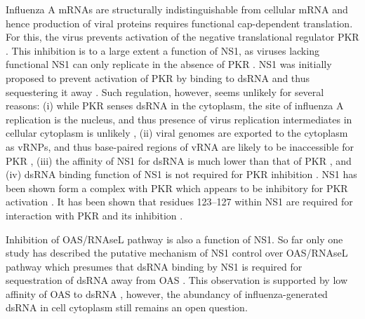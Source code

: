 		Influenza A mRNAs are structurally indistinguishable from cellular mRNA and hence production of viral proteins requires functional cap-dependent translation. For this, the virus prevents activation of the negative translational regulator \gls{PKR}  \parencite{Katze1986, Katze1988}. This inhibition is to a large extent a function of \gls{NS1}, as viruses lacking functional \gls{NS1} can only replicate in the absence of \gls{PKR} \parencite{Bergmann2000a}. \gls{NS1} was initially proposed to prevent activation of \gls{PKR} by binding to dsRNA and thus sequestering it away \parencite{Lu1995}. Such regulation, however, seems unlikely for several reasons: (i) while \gls{PKR} senses dsRNA in the cytoplasm, the site of influenza A replication is the nucleus, and thus presence of virus replication intermediates in cellular cytoplasm is unlikely \parencite{Jackson1982}, (ii) viral genomes are exported to the cytoplasm as \gls{vRNP}s, and thus base-paired regions of \gls{vRNA} are likely to be inaccessible for \gls{PKR} \parencite{Coloma2009}, (iii) the affinity of \gls{NS1} for dsRNA is much lower than that of \gls{PKR} \parencite{Chien2004, Husain2012}, and (iv) dsRNA binding function of \gls{NS1} is not required for \gls{PKR} inhibition \parencite{Li2006}. \gls{NS1} has been shown form a complex with \gls{PKR} which appears to be inhibitory for \gls{PKR} activation \parencite{Tan1998, Li2006}. It has been shown that residues 123--127 within \gls{NS1} are required for interaction with \gls{PKR} and its inhibition \parencite{Min2007}.	
				
		Inhibition of \gls{OAS}/\gls{RNAseL} pathway is also a function of \gls{NS1}. So far only one study has described the putative mechanism of \gls{NS1} control over \gls{OAS}/\gls{RNAseL} pathway which presumes that dsRNA binding by NS1 is required for sequestration of dsRNA away from \gls{OAS} \parencite{Min2006}. This observation is supported by low affinity of \gls{OAS} to dsRNA \parencite{Hartmann2003}, however, the abundancy of influenza-generated dsRNA in cell cytoplasm still remains an open question.
		
		
		
		
		
		
		
			
		
		
				
	
